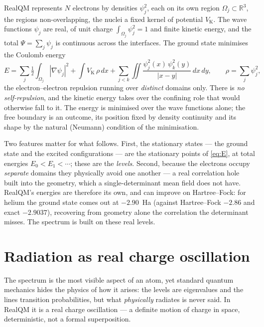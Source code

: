 \documentclass[11pt]{article}
\begin{document}
RealQM \cite{RealQM} represents $N$ electrons by densities $\psi_j^2$, each on its own region
$\Omega_j\subset\mathbb R^3$, the regions non-overlapping, the nuclei a fixed kernel of potential
$V_{\mathrm K}$. The wave functions $\psi_j$ are real, of unit charge $\int_{\Omega_j}\psi_j^2=1$ and finite
kinetic energy, and the total $\Psi=\sum_j\psi_j$ is continuous across the interfaces. The ground state
minimises the Coulomb energy
\begin{equation}
E=\sum_j\tfrac12\!\int_{\Omega_j}|\nabla\psi_j|^2+\int V_{\mathrm K}\,\rho\,dx
+\sum_{j<k}\iint\frac{\psi_j^2(x)\,\psi_k^2(y)}{|x-y|}\,dx\,dy,
\qquad \rho=\sum_j\psi_j^2 ,
\label{eq:E}
\end{equation}
the electron--electron repulsion running over \emph{distinct} domains only. There is \emph{no
self-repulsion}, and the kinetic energy takes over the confining role that would otherwise fall to it. The
energy is minimised over the wave functions alone; the free boundary is an outcome, its position fixed by
density continuity and its shape by the natural (Neumann) condition of the minimisation.

Two features matter for what follows. First, the stationary states --- the ground state and the excited
configurations --- are the stationary points of \eqref{eq:E}, at total energies $E_0<E_1<\cdots$; these are
the \emph{levels}. Second, because the electrons occupy \emph{separate} domains they physically avoid one
another --- a real correlation hole built into the geometry, which a single-determinant mean field does not
have. RealQM's energies are therefore its own, and can improve on Hartree--Fock: for helium the ground state
comes out at $-2.90$~Ha (against Hartree--Fock $-2.86$ and exact $-2.9037$), recovering from geometry alone
the correlation the determinant misses. The spectrum is built on these real levels.

\section{Radiation as real charge oscillation}
\label{sec:osc}

The spectrum is the most visible aspect of an atom, yet standard quantum mechanics hides the physics of how
it arises: the levels are eigenvalues and the lines transition probabilities, but what \emph{physically}
radiates is never said. In RealQM it is a real charge oscillation --- a definite motion of charge in space,
deterministic, not a formal superposition.
\end{document}
